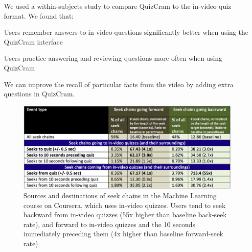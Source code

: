 \documentclass{sigchi}
\begin{document}
We used a within-subjects study to compare QuizCram to the in-video quiz format. We found that:


\begin{compactitem}
\item Users remember answers to in-video questions significantly better when using the QuizCram interface
\item Users practice answering and reviewing questions more often when using QuizCram
\item We can improve the recall of particular facts from the video by adding extra questions in QuizCram.
\end{compactitem}


\begin{figure}
\includegraphics[width=1.0\columnwidth]{seek-sources-and-destinations-short}
\caption{Sources and destinations of seek chains in the Machine Learning course on Coursera, which uses in-video quizzes. Users tend to seek backward from in-video quizzes (55x higher than baseline back-seek rate), and forward to in-video quizzes and the 10 seconds immediately preceding them (4x higher than baseline forward-seek rate)}
\label{fig:seek-sources-and-destinations-short}
\end{figure}
\end{document}
